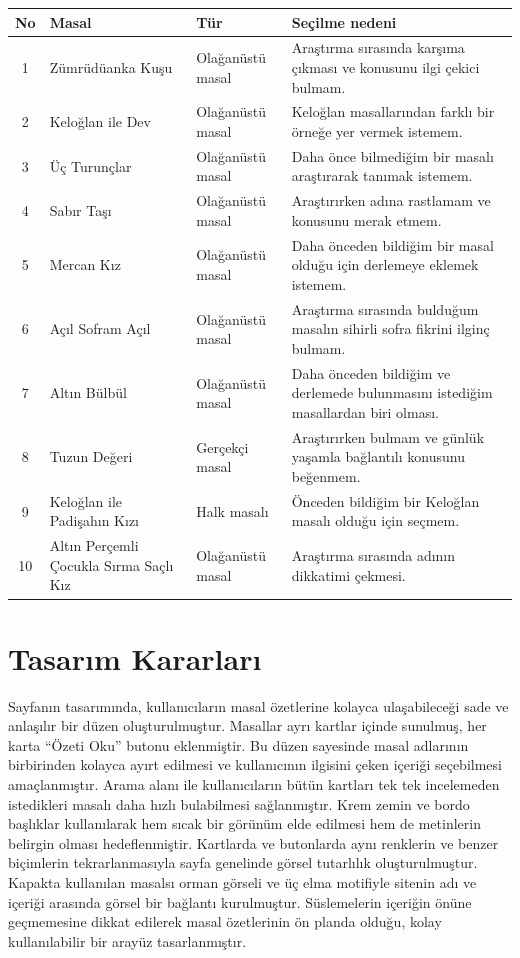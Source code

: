\documentclass[12pt,a4paper]{article}
\begin{document}
\begin{longtable}{@{}cp{4cm}p{3cm}p{5.4cm}@{}}
\toprule
\textbf{No} & \textbf{Masal} & \textbf{Tür} & \textbf{Seçilme nedeni} \\
\midrule
\endhead
1 & Zümrüdüanka Kuşu & Olağanüstü masal & Araştırma sırasında karşıma çıkması ve konusunu ilgi çekici bulmam. \\
2 & Keloğlan ile Dev & Olağanüstü masal & Keloğlan masallarından farklı bir örneğe yer vermek istemem. \\
3 & Üç Turunçlar & Olağanüstü masal & Daha önce bilmediğim bir masalı araştırarak tanımak istemem. \\
4 & Sabır Taşı & Olağanüstü masal & Araştırırken adına rastlamam ve konusunu merak etmem. \\
5 & Mercan Kız & Olağanüstü masal & Daha önceden bildiğim bir masal olduğu için derlemeye eklemek istemem. \\
6 & Açıl Sofram Açıl & Olağanüstü masal & Araştırma sırasında bulduğum masalın sihirli sofra fikrini ilginç bulmam. \\
7 & Altın Bülbül & Olağanüstü masal & Daha önceden bildiğim ve derlemede bulunmasını istediğim masallardan biri olması. \\
8 & Tuzun Değeri & Gerçekçi masal & Araştırırken bulmam ve günlük yaşamla bağlantılı konusunu beğenmem. \\
9 & Keloğlan ile Padişahın Kızı & Halk masalı & Önceden bildiğim bir Keloğlan masalı olduğu için seçmem. \\
10 & Altın Perçemli Çocukla Sırma Saçlı Kız & Olağanüstü masal & Araştırma sırasında adının dikkatimi çekmesi. \\
\bottomrule
\end{longtable}

\section{Tasarım Kararları}
Sayfanın tasarımında, kullanıcıların masal özetlerine kolayca ulaşabileceği sade ve anlaşılır bir düzen oluşturulmuştur. Masallar ayrı kartlar içinde sunulmuş, her karta “Özeti Oku” butonu eklenmiştir. Bu düzen sayesinde masal adlarının birbirinden kolayca ayırt edilmesi ve kullanıcının ilgisini çeken içeriği seçebilmesi amaçlanmıştır. Arama alanı ile kullanıcıların bütün kartları tek tek incelemeden istedikleri masalı daha hızlı bulabilmesi sağlanmıştır. Krem zemin ve bordo başlıklar kullanılarak hem sıcak bir görünüm elde edilmesi hem de metinlerin belirgin olması hedeflenmiştir. Kartlarda ve butonlarda aynı renklerin ve benzer biçimlerin tekrarlanmasıyla sayfa genelinde görsel tutarlılık oluşturulmuştur. Kapakta kullanılan masalsı orman görseli ve üç elma motifiyle sitenin adı ve içeriği arasında görsel bir bağlantı kurulmuştur. Süslemelerin içeriğin önüne geçmemesine dikkat edilerek masal özetlerinin ön planda olduğu, kolay kullanılabilir bir arayüz tasarlanmıştır.
\end{document}
